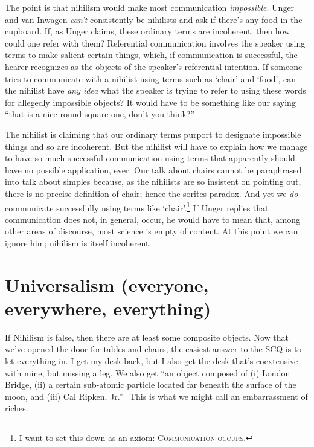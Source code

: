 
The point is that nihilism would make most communication {\em impossible}. Unger and van Inwagen {\em can't} consistently be nihilists and ask if there's any food in the cupboard. If, as Unger claims, these ordinary terms are incoherent, then how could one refer with them? Referential communication involves the speaker using terms to make salient certain things, which, if communication is successful, the hearer recognizes as the objects of the speaker's referential intention. If someone tries to communicate with a nihilist using terms such as `chair' and `food', can the nihilist have {\em any idea} what the speaker is trying to refer to using these words for allegedly impossible objects? It would have to be something like our saying ``that is a nice round square one, don't you think?''%
%

The nihilist is claiming that our ordinary terms purport to designate impossible things and so are incoherent. But the nihilist will have to explain how we manage to have so much successful communication using terms that apparently should have no possible application, ever. Our talk about chairs cannot be paraphrased into talk about simples because, as the nihilists are so insistent on pointing out, there is no precise definition of chair; hence the sorites paradox. And yet we {\em do} communicate successfully using terms like `chair'.\footnote{I want to set this down as an axiom: \textsc{Communication occurs.}} If Unger replies that communication does not, in general, occur, he would have to mean that, among other areas of discourse, most science is empty of content. At this point we can ignore him; nihilism is itself incoherent.

\section{Universalism (everyone, everywhere, everything)}
If Nihilism is false, then there are at least some composite objects. Now that we've opened the door for tables and chairs, the easiest answer to the SCQ is to let everything in. I get my desk back, but I also get the desk that's coextensive with mine, but missing a leg. We also get ``an object composed of (i) London Bridge, (ii) a certain sub-atomic particle located far beneath the surface of the moon, and (iii) Cal Ripken, Jr.''~\citep[228]{markosian1998a} %
This is what we might call an embarrassment of riches.

